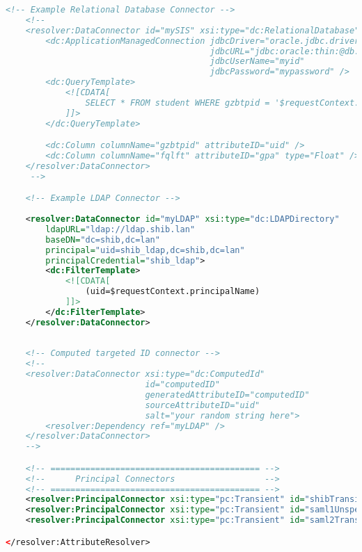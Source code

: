 \begin{lstlisting}[language=xml]
    <!-- Example Relational Database Connector -->
    <!--
    <resolver:DataConnector id="mySIS" xsi:type="dc:RelationalDatabase">
        <dc:ApplicationManagedConnection jdbcDriver="oracle.jdbc.driver.OracleDriver"
                                         jdbcURL="jdbc:oracle:thin:@db.example.org:1521:SomeDB" 
                                         jdbcUserName="myid" 
                                         jdbcPassword="mypassword" />
        <dc:QueryTemplate>
            <![CDATA[
                SELECT * FROM student WHERE gzbtpid = '$requestContext.principalName'
            ]]>
        </dc:QueryTemplate>

        <dc:Column columnName="gzbtpid" attributeID="uid" />
        <dc:Column columnName="fqlft" attributeID="gpa" type="Float" />
    </resolver:DataConnector>
     -->

    <!-- Example LDAP Connector -->
    
    <resolver:DataConnector id="myLDAP" xsi:type="dc:LDAPDirectory"
        ldapURL="ldap://ldap.shib.lan" 
        baseDN="dc=shib,dc=lan" 
        principal="uid=shib_ldap,dc=shib,dc=lan"
        principalCredential="shib_ldap">
        <dc:FilterTemplate>
            <![CDATA[
                (uid=$requestContext.principalName)
            ]]>
        </dc:FilterTemplate>
    </resolver:DataConnector>
    
    
    <!-- Computed targeted ID connector -->
    <!--
    <resolver:DataConnector xsi:type="dc:ComputedId"
                            id="computedID"
                            generatedAttributeID="computedID"
                            sourceAttributeID="uid"
                            salt="your random string here">
        <resolver:Dependency ref="myLDAP" />
    </resolver:DataConnector> 
    -->

    <!-- ========================================== -->
    <!--      Principal Connectors                  -->
    <!-- ========================================== -->
    <resolver:PrincipalConnector xsi:type="pc:Transient" id="shibTransient" nameIDFormat="urn:mace:shibboleth:1.0:nameIdentifier"/>
    <resolver:PrincipalConnector xsi:type="pc:Transient" id="saml1Unspec" nameIDFormat="urn:oasis:names:tc:SAML:1.1:nameid-format:unspecified"/>
    <resolver:PrincipalConnector xsi:type="pc:Transient" id="saml2Transient" nameIDFormat="urn:oasis:names:tc:SAML:2.0:nameid-format:transient"/>

</resolver:AttributeResolver>
\end{lstlisting}

